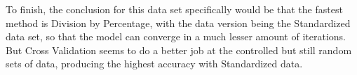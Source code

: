 \documentclass[11pt]{article}
\begin{document}
To finish, the conclusion for this data set specifically would be that the fastest method is Division by Percentage, with the data version being the Standardized data set, so that the model can converge in a much lesser amount of iterations. But Cross Validation seems to do a better job at the controlled but still random sets of data, producing the highest accuracy with Standardized data.

\printbibliography
 
\end{document}
